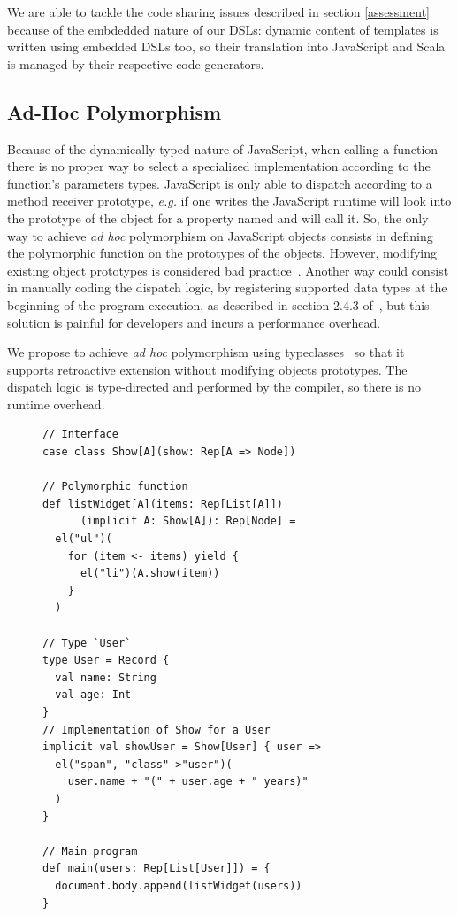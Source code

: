\documentclass[preprint]{sigplanconf}
\newcommand{\eg}{\emph{e.g.}}
\begin{document}
We are able to tackle the code sharing issues described in section \ref{assessment} because of the embdedded nature
of our DSLs: dynamic content of templates is written using embedded DSLs too, so their translation into JavaScript
and Scala is managed by their respective code generators.

\subsection{Ad-Hoc Polymorphism}

Because of the dynamically typed nature of JavaScript, when calling a function there is no proper way to select a
specialized implementation according to the function’s parameters types. JavaScript is only able to dispatch
according to a method receiver prototype, \eg{} if one writes  the JavaScript runtime will look into
the prototype of the  object for a property named  and will call it. So, the only way to achieve
\emph{ad hoc} polymorphism on JavaScript objects consists in defining the polymorphic function on the prototypes of
the objects. However, modifying existing object prototypes is considered bad
practice~\cite{Zakas12_MaintainableJs}. Another way could consist in manually coding the dispatch logic, by
registering supported data types at the beginning of the program execution, as described in section 2.4.3
of~\cite{Abelson83_SICP}, but this solution is painful for developers and incurs a performance overhead.

We propose to achieve \emph{ad hoc} polymorphism using
typeclasses~\cite{Wadler89_AdhocPolymorphism,Odersky06_Typeclasses,Oliveira10_Typeclasses} so that it supports
retroactive extension without modifying objects prototypes. The dispatch logic is type-directed and performed by the
compiler, so there is no runtime overhead.

\begin{figure}
\begin{lstlisting}[label=polymorphism,caption=Ad hoc polymorphism using typeclasses]
// Interface
case class Show[A](show: Rep[A => Node])

// Polymorphic function
def listWidget[A](items: Rep[List[A]])
      (implicit A: Show[A]): Rep[Node] =
  el("ul")(
    for (item <- items) yield {
      el("li")(A.show(item))
    }
  )

// Type `User`
type User = Record {
  val name: String
  val age: Int
}
// Implementation of Show for a User
implicit val showUser = Show[User] { user =>
  el("span", "class"->"user")(
    user.name + "(" + user.age + " years)"
  )
}

// Main program
def main(users: Rep[List[User]]) = {
  document.body.append(listWidget(users))
}
\end{lstlisting}
\end{figure}
\end{document}
